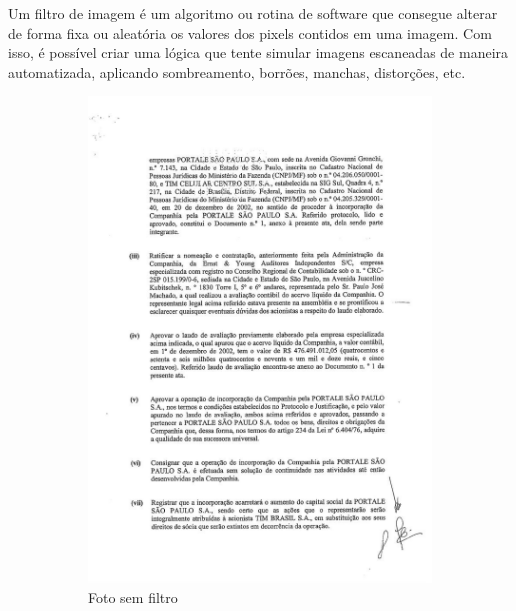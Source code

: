 Um filtro de imagem é um algoritmo ou rotina de software que consegue alterar de forma fixa ou aleatória os valores dos pixels contidos em uma imagem. Com isso, é possível criar uma lógica que tente simular imagens escaneadas de maneira automatizada, aplicando sombreamento, borrões, manchas, distorções, etc.


\begin{figure}[H]
  \centering
  \begin{subfigure}{.5\textwidth}
    \centering
    \includegraphics[width=0.8\linewidth]{figuras/good-text-image.jpg}
    \caption{Foto sem filtro}
    \label{fig:image-without-filter}
  \end{subfigure}%
  \begin{subfigure}{.5\textwidth}
    \centering

\end{subfigure}
\end{figure}
